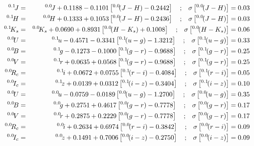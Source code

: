 \documentclass[10pt,preprint]{aastex}
\newcommand{\band}[2]{\ensuremath{^{{#1}}\!{#2}}}
\begin{document}
\begin{eqnarray}
\band{0.1}{J} &=& \band{0.0}{J} + 0.1188 - 0.1101 \left[ \band{0.0}{(J-H)} - 0.2442 \right] \quad \mathrm{;}  \quad \sigma\left[\band{0.0}{(J-H)}\right] = 0.03\cr
\band{0.1}{H} &=& \band{0.0}{H} + 0.1333 + 0.1053 \left[ \band{0.0}{(J-H)} - 0.2436 \right] \quad \mathrm{;}  \quad \sigma\left[\band{0.0}{(J-H)}\right] = 0.03\cr
\band{0.1}{K_s} &=& \band{0.0}{K_s} + 0.0690 + 0.8931 \left[ \band{0.0}{(H-K_s)} + 0.1008 \right] \quad \mathrm{;}  \quad \sigma\left[\band{0.0}{(H-K_s)}\right] = 0.06\cr
\band{0.0}{U} &=& \band{0.1}{u} - 0.4571 - 0.3341 \left[ \band{0.1}{(u-g)} - 1.3212 \right] \quad \mathrm{;}  \quad \sigma\left[\band{0.1}{(u-g)}\right] = 0.33\cr
\band{0.0}{B} &=& \band{0.1}{g} - 0.1273 - 0.1000 \left[ \band{0.1}{(g-r)} - 0.9688 \right] \quad \mathrm{;}  \quad \sigma\left[\band{0.1}{(g-r)}\right] = 0.25\cr
\band{0.0}{V} &=& \band{0.1}{r} + 0.0635 + 0.0568 \left[ \band{0.1}{(g-r)} - 0.9688 \right] \quad \mathrm{;}  \quad \sigma\left[\band{0.1}{(g-r)}\right] = 0.25\cr
\band{0.0}{R_c} &=& \band{0.1}{i} + 0.0672 + 0.0755 \left[ \band{0.1}{(r-i)} - 0.4084 \right] \quad \mathrm{;}  \quad \sigma\left[\band{0.1}{(r-i)}\right] = 0.05\cr
\band{0.0}{I_c} &=& \band{0.1}{z} + 0.0139 + 0.0312 \left[ \band{0.1}{(i-z)} - 0.3404 \right] \quad \mathrm{;}  \quad \sigma\left[\band{0.1}{(i-z)}\right] = 0.10\cr
\band{0.0}{U} &=& \band{0.0}{u} - 0.0759 - 0.0189 \left[ \band{0.0}{(u-g)} - 1.2700 \right] \quad \mathrm{;}  \quad \sigma\left[\band{0.0}{(u-g)}\right] = 0.35\cr
\band{0.0}{B} &=& \band{0.0}{g} + 0.2751 + 0.4617 \left[ \band{0.0}{(g-r)} - 0.7778 \right] \quad \mathrm{;}  \quad \sigma\left[\band{0.0}{(g-r)}\right] = 0.17\cr
\band{0.0}{V} &=& \band{0.0}{r} + 0.2875 + 0.2229 \left[ \band{0.0}{(g-r)} - 0.7778 \right] \quad \mathrm{;}  \quad \sigma\left[\band{0.0}{(g-r)}\right] = 0.17\cr
\band{0.0}{R_c} &=& \band{0.0}{i} + 0.2634 + 0.6974 \left[ \band{0.0}{(r-i)} - 0.3842 \right] \quad \mathrm{;}  \quad \sigma\left[\band{0.0}{(r-i)}\right] = 0.09\cr
\band{0.0}{I_c} &=& \band{0.0}{z} + 0.1491 + 0.7006 \left[ \band{0.0}{(i-z)} - 0.2750 \right] \quad \mathrm{;}  \quad \sigma\left[\band{0.0}{(i-z)}\right] = 0.09\cr
\end{eqnarray}
\end{document}

